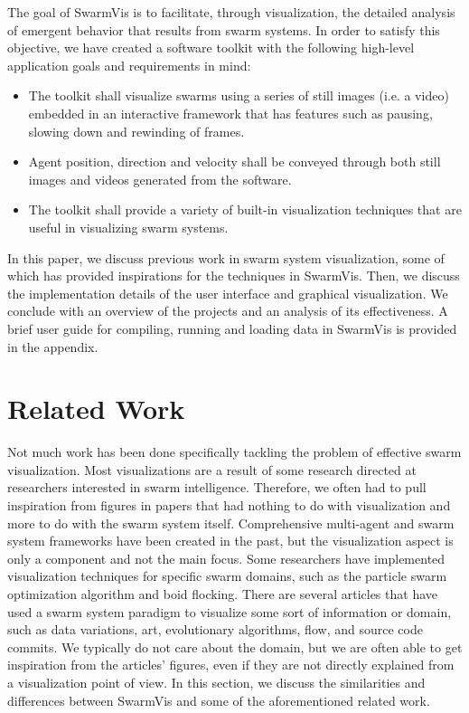 \documentclass[conference]{IEEEtran}
\begin{document}
The goal of SwarmVis is to facilitate, through visualization, the detailed analysis of emergent behavior that results from swarm systems. In order to satisfy this objective, we have created a software toolkit with the following high-level application goals and requirements in mind:
\begin{itemize}
\item The toolkit shall visualize swarms using a series of still images (i.e. a video) embedded in an interactive framework that has features such as pausing, slowing down and rewinding of frames.
\item Agent position, direction and velocity shall be conveyed through both still images and videos generated from the software.
\item The toolkit shall provide a variety of built-in visualization techniques that are useful in visualizing swarm systems.
\end{itemize}

In this paper, we discuss previous work in swarm system visualization,
some of which has provided inspirations for the techniques in SwarmVis.
Then, we discuss the implementation details of the user interface and graphical visualization.
We conclude with an overview of the projects and an analysis of its effectiveness.
A brief user guide for compiling, running and loading data in SwarmVis is provided in the appendix.

\section{Related Work}
Not much work has been done specifically tackling the problem of effective swarm visualization. Most visualizations are
a result of some research directed at researchers interested in swarm intelligence. Therefore, we often had to pull inspiration
from figures in papers that had nothing to do with visualization and more to do with the swarm system itself.
Comprehensive multi-agent and swarm system frameworks \cite{Luke}\cite{860347} have been created in the past,
but the visualization aspect is only a component and not the main focus. Some researchers have implemented
visualization techniques for specific swarm domains, such as the particle swarm optimization algorithm\cite{Secrest} and 
boid flocking\cite{reynolds1987}.
There are several articles that have used a swarm system paradigm to visualize some sort of information or domain, such as 
data variations\cite{1382896}, art\cite{Boyd}, evolutionary algorithms\cite{spector2005ecb}\cite{Spector02evolutionarydynamics},
flow\cite{10.1109/TVCG.2005.87}\cite{Merzkirch}, and source code commits\cite{codeswarm:website}.
We typically do not care about the domain, but we are often able to get inspiration from the articles' figures, even if they are 
not directly explained from a visualization point of view.
In this section, we discuss the similarities and differences between SwarmVis and some of the aforementioned related work.
\end{document}

